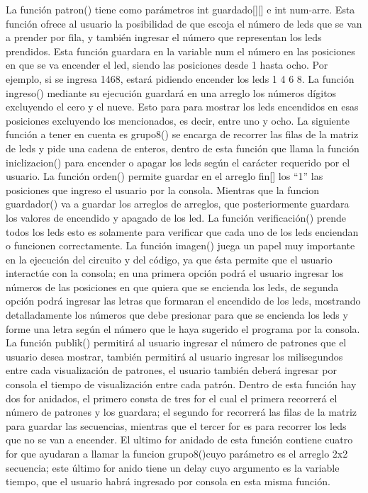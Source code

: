 \documentclass{article}
\begin{document}
La función patron() tiene como parámetros  int guardado[][] e int num-arre. Esta función ofrece al usuario la posibilidad de que escoja el número de leds que se van a prender por fila, y también ingresar el número que representan los leds prendidos. Esta función guardara en la variable num el número en las posiciones en que se va encender el led, siendo las posiciones desde 1 hasta ocho. Por ejemplo, si se ingresa 1468, estará pidiendo encender los leds 1 4 6 8.
La función ingreso() mediante su ejecución guardará en una arreglo los números dígitos excluyendo el cero y el nueve. Esto para para mostrar los leds encendidos en esas posiciones excluyendo los mencionados, es decir, entre uno y ocho.
La siguiente función a tener en cuenta es  grupo8() se encarga de recorrer las filas de la matriz de leds y pide una cadena de enteros, dentro de esta función que llama la función iniclizacion() para encender o apagar los leds según el carácter requerido por el usuario.
La función orden() permite guardar en el arreglo fin[] los “1” las posiciones que ingreso el usuario por la consola.  Mientras que la funcion guardador() va a guardar los arreglos de arreglos, que posteriormente guardara los valores de encendido y apagado de los led.
La función verificación() prende todos los leds esto es solamente para verificar que cada uno de los leds enciendan o funcionen correctamente.
La función  imagen() juega un papel muy importante en la ejecución del circuito y del código, ya que ésta permite que el usuario interactúe con la consola; en una primera opción podrá el usuario ingresar los números de las posiciones en que quiera que se encienda los leds, de segunda opción podrá ingresar las letras que formaran el encendido de los leds, mostrando detalladamente los números que debe presionar para que se encienda los leds y forme una letra según el número que le haya sugerido el programa por la consola.
La función publik() permitirá al usuario ingresar el número de patrones que el usuario desea mostrar, también permitirá al usuario ingresar los milisegundos entre cada visualización de patrones, el usuario también deberá ingresar por consola el tiempo de visualización entre cada patrón. Dentro de esta función hay dos for anidados, el primero consta de tres for el cual el primera recorrerá el número de patrones y los guardara; el segundo for recorrerá las filas de la matriz para guardar las secuencias, mientras que el tercer for es para recorrer los leds que no se van a encender. El ultimo for anidado de esta función contiene cuatro for que ayudaran a llamar la funcion grupo8()cuyo parámetro es el arreglo 2x2 secuencia; este último for anido tiene un delay cuyo argumento es la variable tiempo, que el usuario habrá ingresado por consola en esta misma función.
\end{document}
